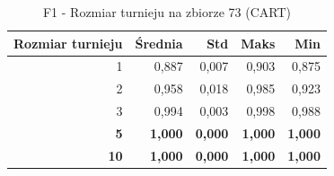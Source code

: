\begin{table}[htbp]
\centering
\small
\setlength{\tabcolsep}{6pt}
\renewcommand{\arraystretch}{1.2}
\caption{F1 - Rozmiar turnieju na zbiorze 73 (CART)}
\label{tab:CART_tournament_size_73_f1}
\begin{tabular}{r|r|r|r|r}
\toprule
Rozmiar turnieju & Średnia & Std & Maks & Min \\
\hline
1 & 0,887 & 0,007 & 0,903 & 0,875 \\
2 & 0,958 & 0,018 & 0,985 & 0,923 \\
3 & 0,994 & 0,003 & 0,998 & 0,988 \\
\textbf{5} & \textbf{1,000} & \textbf{0,000} & \textbf{1,000} & \textbf{1,000} \\
\textbf{10} & \textbf{1,000} & \textbf{0,000} & \textbf{1,000} & \textbf{1,000} \\
\bottomrule
\end{tabular}
\end{table}
